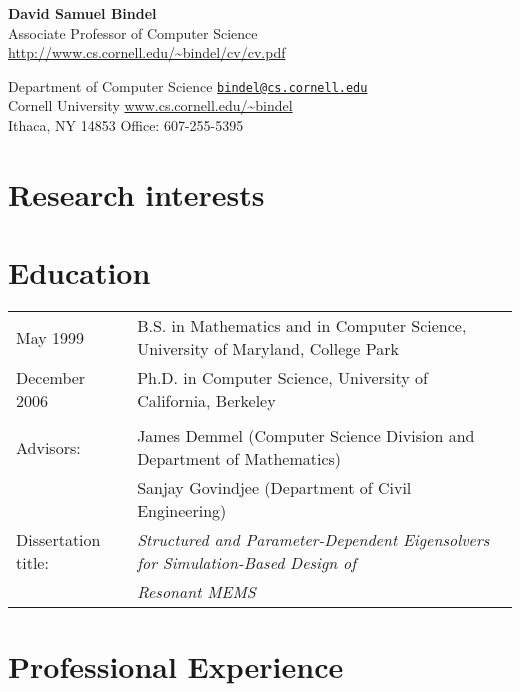 \documentclass{article}
\begin{document}
\begin{center}
  {\Large \bf David Samuel Bindel} \\
  Associate Professor of Computer Science \\
  \url{http://www.cs.cornell.edu/~bindel/cv/cv.pdf}
\end{center}

\begin{trivlist}
\item
Department of Computer Science
  \hfill \href{mail:bindel@cs.cornell.edu}{\tt bindel@cs.cornell.edu} \\
Cornell University
  \hfill \url{www.cs.cornell.edu/~bindel} \\
Ithaca, NY 14853
  \hfill Office: 607-255-5395
\end{trivlist}


\section*{Research interests}



\section*{Education}

\begin{tabular}{ll}
May 1999 &
  B.S. in Mathematics and in Computer Science,
  University of Maryland, College Park \\
December 2006 &
  Ph.D. in Computer Science, University of California, Berkeley
\\
\\
Advisors:
 & James Demmel (Computer Science Division and Department of Mathematics) \\
 & Sanjay Govindjee (Department of Civil Engineering) \\
Dissertation title: &
   {\em Structured and Parameter-Dependent Eigensolvers for
        Simulation-Based Design of} \\
&  {\em Resonant MEMS}
\end{tabular}


\section*{Professional Experience}
\end{document}
